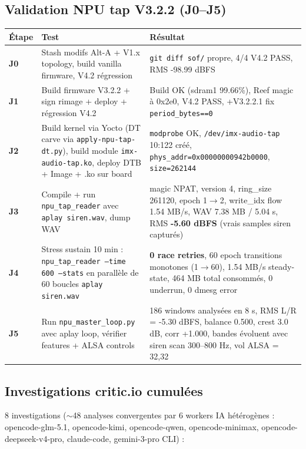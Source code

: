 \documentclass[11pt,a4paper]{article}
\begin{document}
\subsection{Validation NPU tap V3.2.2 (J0--J5)}

\begin{longtable}{p{2cm}p{6.5cm}p{6.5cm}}
\toprule
\textbf{Étape} & \textbf{Test} & \textbf{Résultat} \\
\midrule
\endhead
\textbf{J0} & Stash modifs Alt-A + V1.x topology, build vanilla firmware, V4.2 régression  & \texttt{git diff sof/} propre, 4/4 V4.2 PASS, RMS -98.99 dBFS \\
\addlinespace
\textbf{J1} & Build firmware V3.2.2 + sign rimage + deploy + régression V4.2 & Build OK (sdram1 99.66\%), Reef magic à 0x2e0, V4.2 PASS, +V3.2.2.1 fix \texttt{period\_bytes==0} \\
\addlinespace
\textbf{J2} & Build kernel via Yocto (DT carve via \texttt{apply-npu-tap-dt.py}), build module \texttt{imx-audio-tap.ko}, deploy DTB + Image + .ko sur board & \texttt{modprobe} OK, \texttt{/dev/imx-audio-tap} 10:122 créé, \texttt{phys\_addr=0x00000000942b0000}, \texttt{size=262144} \\
\addlinespace
\textbf{J3} & Compile + run \texttt{npu\_tap\_reader} avec \texttt{aplay siren.wav}, dump WAV & magic NPAT, version 4, ring\_size 261120, epoch 1$\to$2, write\_idx flow 1.54 MB/s, WAV 7.38 MB / 5.04 s, RMS \textbf{-5.60 dBFS} (vrais samples siren capturés) \\
\addlinespace
\textbf{J4} & Stress sustain 10 min : \texttt{npu\_tap\_reader --time 600 --stats} en parallèle de 60 boucles \texttt{aplay siren.wav} & \textbf{0 race retries}, 60 epoch transitions monotones (1$\to$60), 1.54 MB/s steady-state, 464 MB total consommés, 0 underrun, 0 dmesg error \\
\addlinespace
\textbf{J5} & Run \texttt{npu\_master\_loop.py} avec aplay loop, vérifier features + ALSA controls & 186 windows analysées en 8 s, RMS L/R = -5.30 dBFS, balance 0.500, crest 3.0 dB, corr +1.000, bandes évoluent avec siren scan 300--800 Hz, vol ALSA = 32,32 \\
\bottomrule
\end{longtable}

\subsection{Investigations critic.io cumulées}

8 investigations ($\sim$48 analyses convergentes par 6 workers IA hétérogènes :
opencode-glm-5.1, opencode-kimi, opencode-qwen, opencode-minimax,
opencode-deepseek-v4-pro, claude-code, gemini-3-pro CLI) :
\end{document}
